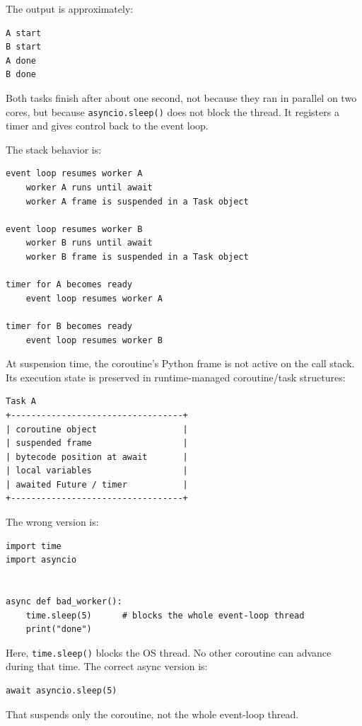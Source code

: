 The output is approximately:

\begin{verbatim}
A start
B start
A done
B done
\end{verbatim}

Both tasks finish after about one second, not because they ran in parallel on two cores, but because \texttt{asyncio.sleep()} does not block the thread. It registers a timer and gives control back to the event loop.

The stack behavior is:

\begin{verbatim}
event loop resumes worker A
    worker A runs until await
    worker A frame is suspended in a Task object

event loop resumes worker B
    worker B runs until await
    worker B frame is suspended in a Task object

timer for A becomes ready
    event loop resumes worker A

timer for B becomes ready
    event loop resumes worker B
\end{verbatim}

At suspension time, the coroutine's Python frame is not active on the call stack. Its execution state is preserved in runtime-managed coroutine/task structures:

\begin{verbatim}
Task A
+----------------------------------+
| coroutine object                 |
| suspended frame                  |
| bytecode position at await       |
| local variables                  |
| awaited Future / timer           |
+----------------------------------+
\end{verbatim}

The wrong version is:

\begin{verbatim}
import time
import asyncio


async def bad_worker():
    time.sleep(5)      # blocks the whole event-loop thread
    print("done")
\end{verbatim}

Here, \texttt{time.sleep()} blocks the OS thread. No other coroutine can advance during that time. The correct async version is:

\begin{verbatim}
await asyncio.sleep(5)
\end{verbatim}

That suspends only the coroutine, not the whole event-loop thread.

